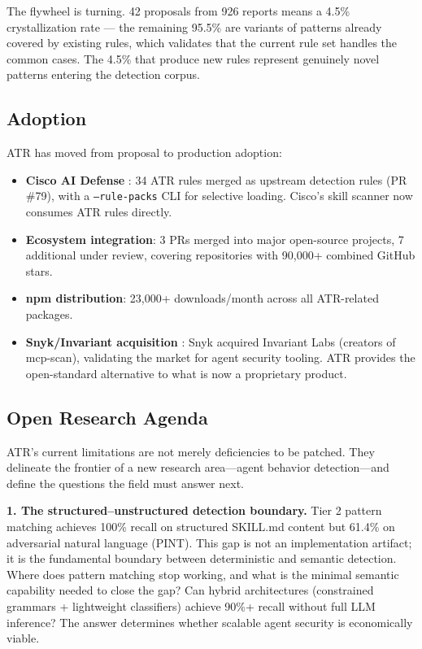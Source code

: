\documentclass[11pt,letterpaper]{article}
\begin{document}
The flywheel is turning. 42 proposals from 926 reports means a 4.5\% crystallization rate --- the remaining 95.5\% are variants of patterns already covered by existing rules, which validates that the current rule set handles the common cases. The 4.5\% that produce new rules represent genuinely novel patterns entering the detection corpus.


\subsection{Adoption}

ATR has moved from proposal to production adoption:

\begin{itemize}
\item \textbf{Cisco AI Defense} \cite{ciscopr79}: 34 ATR rules merged as upstream detection rules (PR \#79), with a \texttt{--rule-packs} CLI for selective loading. Cisco's skill scanner now consumes ATR rules directly.
\item \textbf{Ecosystem integration}: 3 PRs merged into major open-source projects, 7 additional under review, covering repositories with 90,000+ combined GitHub stars.
\item \textbf{npm distribution}: 23,000+ downloads/month across all ATR-related packages.
\item \textbf{Snyk/Invariant acquisition} \cite{snykinvariant}: Snyk acquired Invariant Labs (creators of mcp-scan), validating the market for agent security tooling. ATR provides the open-standard alternative to what is now a proprietary product.
\end{itemize}


\subsection{Open Research Agenda}

ATR's current limitations are not merely deficiencies to be patched. They delineate the frontier of a new research area---agent behavior detection---and define the questions the field must answer next.

\textbf{1. The structured--unstructured detection boundary.} Tier 2 pattern matching achieves 100\% recall on structured SKILL.md content but 61.4\% on adversarial natural language (PINT). This gap is not an implementation artifact; it is the fundamental boundary between deterministic and semantic detection. Where does pattern matching stop working, and what is the minimal semantic capability needed to close the gap? Can hybrid architectures (constrained grammars + lightweight classifiers) achieve 90\%+ recall without full LLM inference? The answer determines whether scalable agent security is economically viable.
\end{document}
